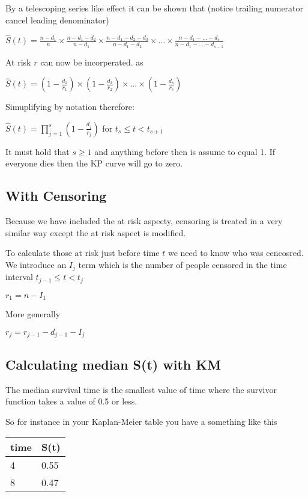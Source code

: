 \documentclass[
  letterpaper,
  DIV=11,
  numbers=noendperiod]{scrreprt}
\begin{document}
By a telescoping series like effect it can be shown that (notice
trailing numerator cancel leading denominator)

\(\hat{S}(t) = \frac{n-d_1}{n} \times \frac{n-d_1 - d_2}{n - d_1} \times \frac{n-d_1 - d_2- d_3}{n - d_1 - d_2} \times ... \times \frac{n - d_1 - ... - d_s}{n - d_1 - ... - d_{s-1}}\)

At risk \(r\) can now be incorperated. as

\(\hat{S}(t) = (1 - \frac{d_1}{r_1}) \times (1 - \frac{d_2}{r_2}) \times ... \times (1 - \frac{d_s}{r_s})\)

Simuplifying by notation therefore:

\(\hat{S}(t) = \prod^s_{j=1}( 1 - \frac{d_j}{r_j})\) for
\(t_s\leq t < t_{s+1}\)

It must hold that \(s\geq 1\) and anything before then is assume to
equal 1. If everyone dies then the KP curve will go to zero.

\hypertarget{with-censoring}{%
\subsection{With Censoring}\label{with-censoring}}

Because we have included the at risk aspecty, censoring is treated in a
very similar way except the at risk aspect is modified.

To calculate those at risk just before time \(t\) we need to know who
was cencosred. We introduce an \(I_j\) term which is the number of
people censored in the time interval \(t_{j-1} \leq t < t_j\)

\(r_1 = n - I_1\)

More generally

\(r_j = r_{j-1} - d_{j-1} - I_j\)

\hypertarget{calculating-median-st-with-km}{%
\subsection{Calculating median S(t) with
KM}\label{calculating-median-st-with-km}}

The median survival time is the smallest value of time where the
survivor function takes a value of 0.5 or less.

So for instance in your Kaplan-Meier table you have a something like
this

\begin{longtable}[]{@{}ll@{}}
\toprule()
time & S(t) \\
\midrule()
\endhead
4 & 0.55 \\
8 & 0.47 \\
\bottomrule()
\end{longtable}
\end{document}
